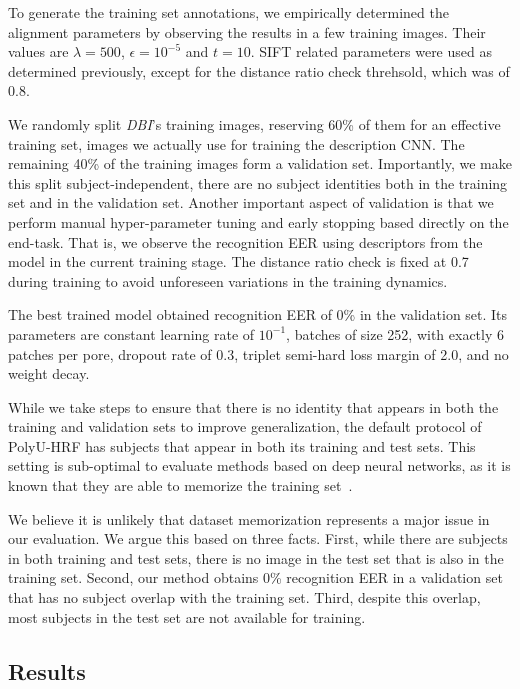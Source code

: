\documentclass[10pt,twocolumn,letterpaper]{article}
\begin{document}
To generate the training set annotations, we empirically determined the alignment parameters by observing the results in a few training images.
Their values are ${\lambda = 500}$, ${\epsilon = 10^{-5}}$ and ${t = 10}$.
SIFT related parameters were used as determined previously, except for the distance ratio check threhsold, which was of 0.8.

We randomly split \textit{DBI}'s training images, reserving 60\% of them for an effective training set, \ie images we actually use for training the description CNN.
The remaining 40\% of the training images form a validation set.
Importantly, we make this split subject-independent, \ie there are no subject identities both in the training set and in the validation set.
Another important aspect of validation is that we perform manual hyper-parameter tuning and early stopping based directly on the end-task.
That is, we observe the recognition EER using descriptors from the model in the current training stage.
The distance ratio check is fixed at 0.7 during training to avoid unforeseen variations in the training dynamics.

The best trained model obtained recognition EER of 0\% in the validation set.
Its parameters are constant learning rate of $10^{-1}$, batches of size 252, with exactly 6 patches per pore, dropout rate of 0.3, triplet semi-hard loss margin of 2.0, and no weight decay.

While we take steps to ensure that there is no identity that appears in both the training and validation sets to improve generalization, the default protocol of PolyU-HRF has subjects that appear in both its training and test sets.
This setting is sub-optimal to evaluate methods based on deep neural networks, as it is known that they are able to memorize the training set~\cite{deep-learning-generalization}.

We believe it is unlikely that dataset memorization represents a major issue in our evaluation.
We argue this based on three facts.
First, while there are subjects in both training and test sets, there is no image in the test set that is also in the training set.
Second, our method obtains 0\% recognition EER in a validation set that has no subject overlap with the training set.
Third, despite this overlap, most subjects in the test set are not available for training.

\subsection{Results}
\end{document}
